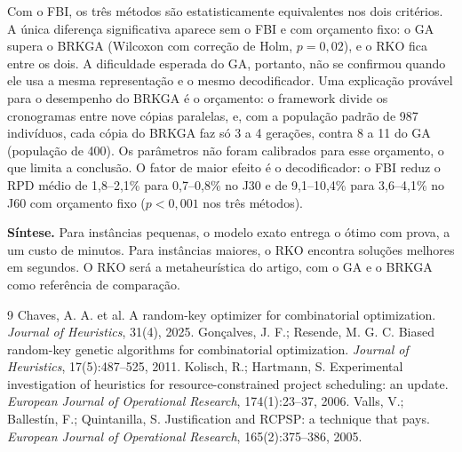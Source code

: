 \documentclass[11pt,a4paper]{article}
\begin{document}
Com o FBI, os três métodos são estatisticamente equivalentes nos dois critérios. A única diferença
significativa aparece sem o FBI e com orçamento fixo: o GA supera o BRKGA (Wilcoxon com correção
de Holm, $p = 0{,}02$), e o RKO fica entre os dois. A dificuldade esperada do GA, portanto, não se
confirmou quando ele usa a mesma representação e o mesmo decodificador. Uma explicação provável
para o desempenho do BRKGA é o orçamento: o framework divide os cronogramas entre nove cópias
paralelas, e, com a população padrão de 987 indivíduos, cada cópia do BRKGA faz só 3 a 4 gerações,
contra 8 a 11 do GA (população de 400). Os parâmetros não foram calibrados para esse orçamento, o
que limita a conclusão. O fator de maior efeito é o decodificador: o FBI reduz o RPD médio de
1,8--2,1\% para 0,7--0,8\% no J30 e de 9,1--10,4\% para 3,6--4,1\% no J60 com orçamento fixo
($p < 0{,}001$ nos três métodos).

\textbf{Síntese.} Para instâncias pequenas, o modelo exato entrega o ótimo com prova, a um custo de
minutos. Para instâncias maiores, o RKO encontra soluções melhores em segundos. O RKO será a
metaheurística do artigo, com o GA e o BRKGA como referência de comparação.

\vspace{-0.6em}
{\scriptsize
\renewcommand{\refname}{\normalsize Referências}
\begin{thebibliography}{9}\setlength{\itemsep}{0pt}
 Chaves, A. A. et al. A random-key optimizer for combinatorial optimization. \emph{Journal of Heuristics}, 31(4), 2025.
 Gonçalves, J. F.; Resende, M. G. C. Biased random-key genetic algorithms for combinatorial optimization. \emph{Journal of Heuristics}, 17(5):487--525, 2011.
 Kolisch, R.; Hartmann, S. Experimental investigation of heuristics for resource-constrained project scheduling: an update. \emph{European Journal of Operational Research}, 174(1):23--37, 2006.
 Valls, V.; Ballestín, F.; Quintanilla, S. Justification and RCPSP: a technique that pays. \emph{European Journal of Operational Research}, 165(2):375--386, 2005.
\end{thebibliography}}
\end{document}
